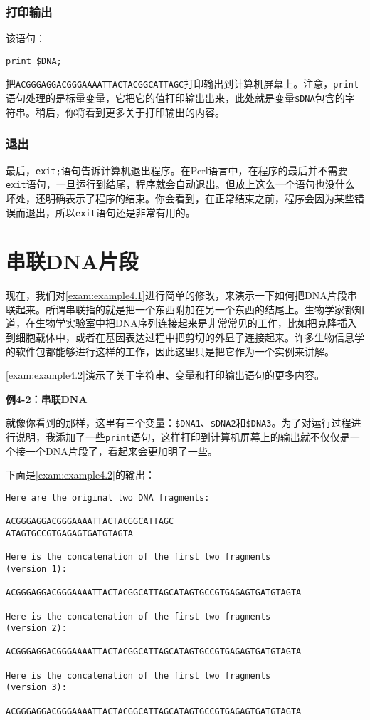 \subsubsection{打印输出}
该语句：

\begin{lstlisting}
print $DNA;
\end{lstlisting}
把\verb|ACGGGAGGACGGGAAAATTACTACGGCATTAGC|打印输出到计算机屏幕上。注意，\verb|print|语句处理的是标量变量，它把它的值打印输出出来，此处就是变量\verb|$DNA|包含的字符串。稍后，你将看到更多关于打印输出的内容。

\subsubsection{退出}
最后，\verb|exit;|语句告诉计算机退出程序。在Perl语言中，在程序的最后并不需要\verb|exit|语句，一旦运行到结尾，程序就会自动退出。但放上这么一个语句也没什么坏处，还明确表示了程序的结束。你会看到，在正常结束之前，程序会因为某些错误而退出，所以\verb|exit|语句还是非常有用的。

\section{串联DNA片段}
现在，我们对\autoref{exam:example4.1}进行简单的修改，来演示一下如何把DNA片段串联起来。所谓串联指的就是把一个东西附加在另一个东西的结尾上。生物学家都知道，在生物学实验室中把DNA序列连接起来是非常常见的工作，比如把克隆插入到细胞载体中，或者在基因表达过程中把剪切的外显子连接起来。许多生物信息学的软件包都能够进行这样的工作，因此这里只是把它作为一个实例来讲解。

\autoref{exam:example4.2}演示了关于字符串、变量和打印输出语句的更多内容。

\textbf{例4-2：串联DNA}


就像你看到的那样，这里有三个变量：\verb|$DNA1|、\verb|$DNA2|和\verb|$DNA3|。为了对运行过程进行说明，我添加了一些\verb|print|语句，这样打印到计算机屏幕上的输出就不仅仅是一个接一个DNA片段了，看起来会更加明了一些。

下面是\autoref{exam:example4.2}的输出：

\begin{lstlisting}
Here are the original two DNA fragments:

ACGGGAGGACGGGAAAATTACTACGGCATTAGC
ATAGTGCCGTGAGAGTGATGTAGTA

Here is the concatenation of the first two fragments
(version 1):

ACGGGAGGACGGGAAAATTACTACGGCATTAGCATAGTGCCGTGAGAGTGATGTAGTA

Here is the concatenation of the first two fragments
(version 2):

ACGGGAGGACGGGAAAATTACTACGGCATTAGCATAGTGCCGTGAGAGTGATGTAGTA

Here is the concatenation of the first two fragments
(version 3):

ACGGGAGGACGGGAAAATTACTACGGCATTAGCATAGTGCCGTGAGAGTGATGTAGTA
\end{lstlisting}


